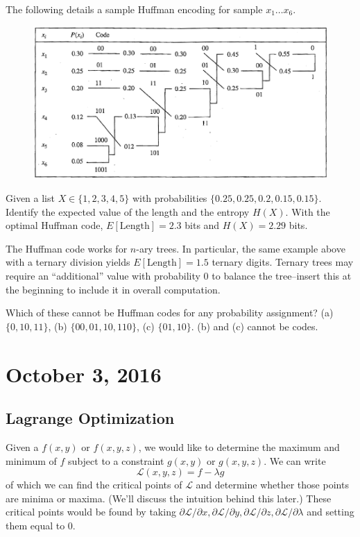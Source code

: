 \documentclass[11pt]{article}
\theoremstyle{definition}
\begin{document}
\example The following details a sample Huffman encoding for sample $x_1 \dots x_6$. %
\begin{figure}[h]
\centering
\includegraphics[scale=1.7]{huffman2.png}
\end{figure}

\example Given a list $X \in \{1,2,3,4,5\}$ with probabilities $\{0.25, 0.25, 0.2, 0.15, 0.15\}$. Identify the expected value of the length and the entropy $H(X)$. With the optimal Huffman code, $E[\text{Length}] = 2.3$ bits and $H(X) = 2.29$ bits. 

\example The Huffman code works for $n$-ary trees. In particular, the same example above with a ternary division yields $E[\text{Length}] = 1.5$ ternary digits. Ternary trees may require an ``additional'' value with probability 0 to balance the tree--insert this at the beginning to include it in overall computation. 

\example Which of these cannot be Huffman codes for any probability assignment? (a) $\{0, 10, 11\}$, (b) $\{00, 01, 10, 110\}$, (c) $\{01, 10\}$. (b) and (c) cannot be codes. 

\section{October 3, 2016}

\subsection{Lagrange Optimization}
Given a $f(x, y)$ or $f(x, y, z)$, we would like to determine the maximum and minimum of $f$ subject to a constraint $g(x, y)$ or $g(x, y, z)$.  We can write $$\mathcal{L}(x, y, z) = f - \lambda g$$of which we can find the critical points of $\mathcal{L}$ and determine whether those points are minima or maxima. (We'll discuss the intuition behind this later.) These critical points would be found by taking $\partial \mathcal{L} / \partial x, \partial \mathcal{L} / \partial y, \partial \mathcal{L} / \partial z, \partial \mathcal{L} / \partial \lambda$ and setting them equal to 0.   
\end{document}
